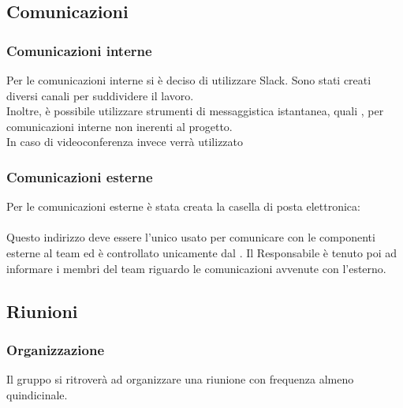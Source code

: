 \subsection{Comunicazioni}
	\subsubsection{Comunicazioni interne}
	Per le comunicazioni interne si è deciso di utilizzare Slack. Sono stati creati diversi canali per suddividere il lavoro. \\
	Inoltre, è possibile utilizzare strumenti di messaggistica istantanea, quali , per comunicazioni interne non inerenti al progetto. \\
	In caso di videoconferenza invece verrà utilizzato 	
	\subsubsection{Comunicazioni esterne}
	Per le comunicazioni esterne è stata creata la casella di posta elettronica: \\
	 \\
	Questo indirizzo deve essere l'unico usato per comunicare con le componenti esterne al team ed è controllato unicamente dal . Il Responsabile è tenuto poi ad informare i membri del team riguardo le comunicazioni avvenute con l'esterno.

\subsection{Riunioni}
	\subsubsection{Organizzazione}
	Il gruppo si ritroverà ad organizzare una riunione con frequenza almeno quindicinale. \\
	
	